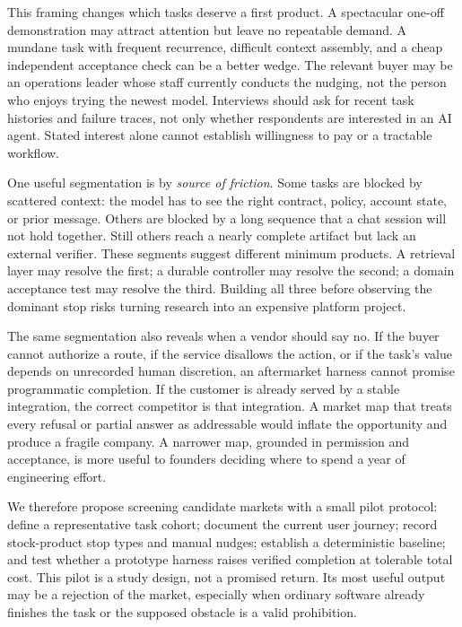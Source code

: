 This framing changes which tasks deserve a first product. A spectacular one-off demonstration may attract attention but leave no repeatable demand. A mundane task with frequent recurrence, difficult context assembly, and a cheap independent acceptance check can be a better wedge. The relevant buyer may be an operations leader whose staff currently conducts the nudging, not the person who enjoys trying the newest model. Interviews should ask for recent task histories and failure traces, not only whether respondents are interested in an AI agent. Stated interest alone cannot establish willingness to pay or a tractable workflow.

One useful segmentation is by \emph{source of friction}. Some tasks are blocked by scattered context: the model has to see the right contract, policy, account state, or prior message. Others are blocked by a long sequence that a chat session will not hold together. Still others reach a nearly complete artifact but lack an external verifier. These segments suggest different minimum products. A retrieval layer may resolve the first; a durable controller may resolve the second; a domain acceptance test may resolve the third. Building all three before observing the dominant stop risks turning research into an expensive platform project.

The same segmentation also reveals when a vendor should say no. If the buyer cannot authorize a route, if the service disallows the action, or if the task's value depends on unrecorded human discretion, an aftermarket harness cannot promise programmatic completion. If the customer is already served by a stable integration, the correct competitor is that integration. A market map that treats every refusal or partial answer as addressable would inflate the opportunity and produce a fragile company. A narrower map, grounded in permission and acceptance, is more useful to founders deciding where to spend a year of engineering effort.

We therefore propose screening candidate markets with a small pilot protocol: define a representative task cohort; document the current user journey; record stock-product stop types and manual nudges; establish a deterministic baseline; and test whether a prototype harness raises verified completion at tolerable total cost. This pilot is a study design, not a promised return. Its most useful output may be a rejection of the market, especially when ordinary software already finishes the task or the supposed obstacle is a valid prohibition.
